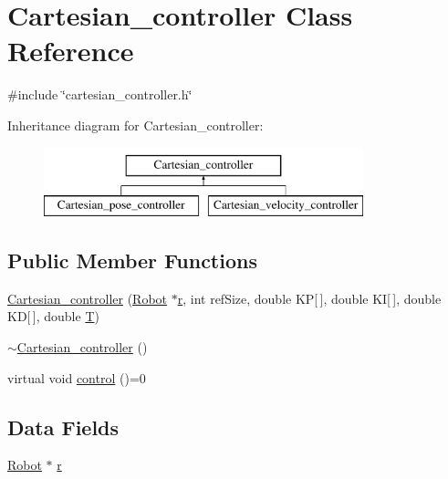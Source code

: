 \hypertarget{classCartesian__controller}{\section{Cartesian\-\_\-controller Class Reference}
\label{classCartesian__controller}
}


{\ttfamily \#include \char`\"{}cartesian\-\_\-controller.\-h\char`\"{}}

Inheritance diagram for Cartesian\-\_\-controller\-:\begin{figure}[H]
\begin{center}
\leavevmode
\includegraphics[height=2.000000cm]{classCartesian__controller}
\end{center}
\end{figure}
\subsection*{Public Member Functions}
\begin{DoxyCompactItemize}
\item 
\hyperlink{classCartesian__controller_a71055bb1cbf01ced9e64bb1d184b68fe}{Cartesian\-\_\-controller} (\hyperlink{structRobot}{Robot} $\ast$\hyperlink{classCartesian__controller_a5562129951bd802e4ded77fc716c87a0}{r}, int ref\-Size, double K\-P\mbox{[}$\,$\mbox{]}, double K\-I\mbox{[}$\,$\mbox{]}, double K\-D\mbox{[}$\,$\mbox{]}, double \hyperlink{classCartesian__controller_a35c6ddbb9624878f2807ff644a33e832}{T})
\item 
\hyperlink{classCartesian__controller_ac29863d92d56a5998ba39ddb58f4a09e}{$\sim$\-Cartesian\-\_\-controller} ()
\item 
virtual void \hyperlink{classCartesian__controller_a8809167cab6d338a957439141fa2bf6c}{control} ()=0
\end{DoxyCompactItemize}
\subsection*{Data Fields}
\begin{DoxyCompactItemize}
\item 
\hyperlink{structRobot}{Robot} $\ast$ \hyperlink{classCartesian__controller_a5562129951bd802e4ded77fc716c87a0}{r}
\end{DoxyCompactItemize}
